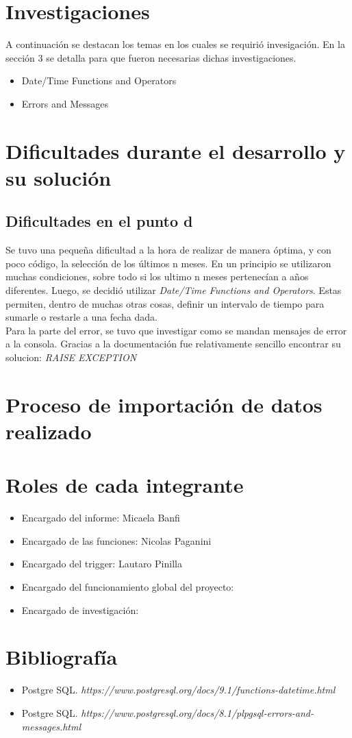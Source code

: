 \documentclass[12pt]{article}
\begin{document}
\section{Investigaciones}
A continuaci\'on se destacan los temas en los cuales se requiri\'o invesigaci\'on. En la secci\'on 3 se detalla para que fueron necesarias dichas investigaciones.
\begin{itemize}
\item Date/Time Functions and Operators
\item Errors and Messages
\end{itemize}

\section{Dificultades durante el desarrollo y su soluci\'on}
\subsection{Dificultades en el punto d}
Se tuvo una pequeña dificultad a la hora de realizar de manera \'optima, y con poco c\'odigo, la selecci\'on de los \'ultimos n meses. En un principio se utilizaron muchas condiciones, sobre todo si los ultimo n meses pertenecían a años diferentes. Luego, se decidi\'o utilizar \textit{Date/Time Functions and Operators}. Estas permiten, dentro de muchas otras cosas, definir un intervalo de tiempo para sumarle o restarle a una fecha dada. \\
Para la parte del error, se tuvo que investigar como se mandan mensajes de error a la consola. Gracias a la documentaci\'on fue relativamente sencillo encontrar su solucion: \textit{RAISE EXCEPTION}

\section{Proceso de importaci\'on de datos realizado}

\section{Roles de cada integrante}
\begin{itemize}
  \item Encargado del informe: Micaela Banfi
  \item Encargado de las funciones: Nicolas Paganini
  \item Encargado del trigger: Lautaro Pinilla
  \item Encargado del funcionamiento global del proyecto: 
  \item Encargado de investigación: 
\end{itemize}
\section{Bibliograf\'ia} 
\begin{itemize}
    \item  Postgre SQL.          \textit{https://www.postgresql.org/docs/9.1/functions-datetime.html}
    \item Postgre SQL.
    \textit{https://www.postgresql.org/docs/8.1/plpgsql-errors-and-messages.html}
\end{itemize}
\end{document}
